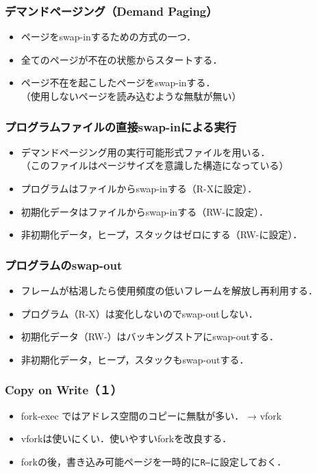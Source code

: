 \documentclass[unicode,handout]{beamer}                   %
\begin{document}
\begin{frame}
  \frametitle{デマンドページング（Demand Paging）}
  \begin{itemize}
  \item ページをswap-inするための方式の一つ．
  \item 全てのページが不在の状態からスタートする．
  \item ページ不在を起こしたページをswap-inする．\\
    （使用しないページを読み込むような無駄が無い）
  \end{itemize}
\end{frame}

\begin{frame}
  \frametitle{プログラムファイルの直接swap-inによる実行}
  \begin{itemize}
  \item デマンドページング用の実行可能形式ファイルを用いる．\\
    （このファイルはページサイズを意識した構造になっている）
  \item プログラムはファイルからswap-inする（R-Xに設定）．
  \item 初期化データはファイルからswap-inする（RW-に設定）．
  \item 非初期化データ，ヒープ，スタックはゼロにする（RW-に設定）．
  \end{itemize}
\end{frame}

\begin{frame}
  \frametitle{プログラムのswap-out}
  \begin{itemize}
  \item フレームが枯渇したら使用頻度の低いフレームを解放し再利用する．
  \item プログラム（R-X）は変化しないのでswap-outしない．
  \item 初期化データ（RW-）はバッキングストアにswap-outする．
  \item 非初期化データ，ヒープ，スタックもswap-outする．
  \end{itemize}
\end{frame}

\begin{frame}
  \frametitle{Copy on Write（１）}
  \begin{itemize}
  \item fork-exec ではアドレス空間のコピーに無駄が多い． → vfork
  \item vforkは使いにくい．使いやすいforkを改良する．
  \item forkの後，書き込み可能ページを一時的に\texttt{R--}に設定しておく．
  \end{itemize}
\end{frame}
\end{document}
